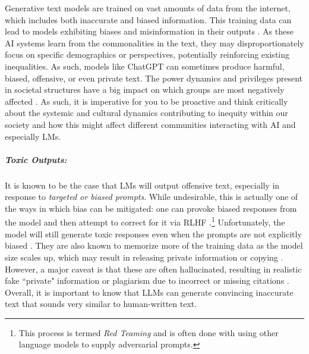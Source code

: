 \documentclass[12pt]{article}
\begin{document}
Generative text models are trained on vast amounts of data from the internet, which includes both inaccurate and biased information. This training data can lead to models exhibiting biases and misinformation in their outputs \cite{Chang2023LanguageMB}. As these AI systems learn from the commonalities in the text, they may disproportionately focus on specific demographics or perspectives, potentially reinforcing existing inequalities. As such, models like ChatGPT can sometimes produce harmful, biased, offensive, or even private text. The power dynamics and privileges present in societal structures have a big impact on which groups are most negatively affected \cite{Blodgett2020LanguageI}. As such, it is imperative for you to be proactive and think critically about the systemic and cultural dynamics contributing to inequity within our society and how this might affect different communities interacting with AI and especially LMs.

\subparagraph{Toxic Outputs:} It is known to be the case that LMs will output offensive text, especially in response to \textit{targeted or biased prompts}. While undesirable, this is actually one of the ways in which bias can be mitigated: one can provoke biased responses from the model and then attempt to correct for it via RLHF \cite{Perez2022RedTL,Ganguli2022RedTL}.\footnote{This process is termed \textit{Red Teaming} and is often done with using other language models to supply adversarial prompts.} Unfortunately, the model will still generate toxic responses even when the prompts are not explicitly biased \cite{Chang2023LanguageMB}. They are also known to memorize more of the training data as the model size scales up, which may result in releasing private information or copying \cite{Perez2022RedTL}. However, a major caveat is that these are often hallucinated, resulting in realistic fake ``private" information or plagiarism due to incorrect or missing citations \cite{Huang2022AreLP}. Overall, it is important to know that LLMs can generate convincing inaccurate text that sounds very similar to human-written text. 
\end{document}
